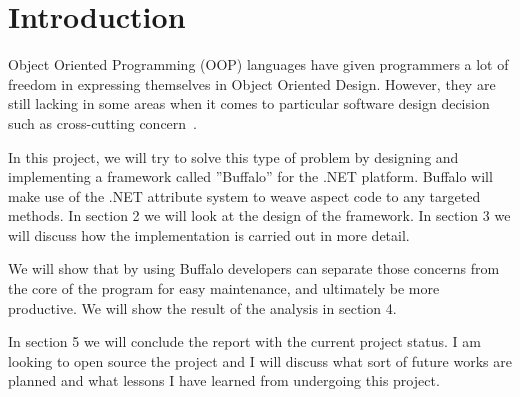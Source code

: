 \chapter{Introduction}


Object Oriented Programming (OOP) languages have given programmers a lot of freedom in expressing themselves in Object Oriented Design. However, they are still lacking in some areas when it comes to particular software design decision such as cross-cutting concern~\cite{aop}.

In this project, we will try to solve this type of problem by designing and implementing a framework called ”Buffalo” for the .NET platform. Buffalo will make use of the .NET attribute system to weave aspect code to any targeted methods. In section 2 we will look at the design of the framework. In section 3 we will discuss how the implementation is carried out in more detail.

We will show that by using Buffalo developers can separate those concerns from the core of the program for easy maintenance, and ultimately be more productive. We will show the result of the analysis in section 4.

In section 5 we will conclude the report with the current project status. I am looking to open source the project and I will discuss what sort of future works are planned and what lessons I have learned from undergoing this project.
